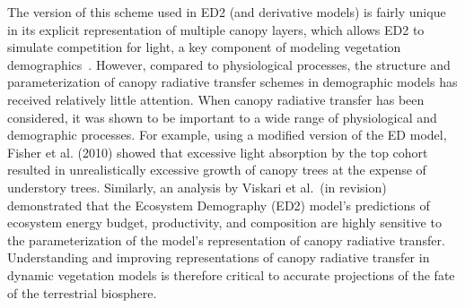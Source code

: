The version of this scheme used in ED2 (and derivative models) is fairly unique in its explicit representation of multiple canopy layers, which allows ED2 to simulate competition for light, a key component of modeling vegetation demographics~\parencite{fisher2017vegetation}.
However, compared to physiological processes, the structure and parameterization of canopy radiative transfer schemes in demographic models has received relatively little attention.
When canopy radiative transfer has been considered, it was shown to be important to a wide range of physiological and demographic processes.
For example, using a modified version of the ED model, Fisher et al. (2010)\nocite{fisher_2010_assessing} showed that excessive light absorption by the top cohort resulted in unrealistically excessive growth of canopy trees at the expense of understory trees.
Similarly, an analysis by Viskari et al.\ (in revision) \nocite{viskari_2019_influence} demonstrated that the Ecosystem Demography (ED2) model's predictions of ecosystem energy budget, productivity, and composition are highly sensitive to the parameterization of the model's representation of canopy radiative transfer.
Understanding and improving representations of canopy radiative transfer in dynamic vegetation models is therefore critical to accurate projections of the fate of the terrestrial biosphere.






